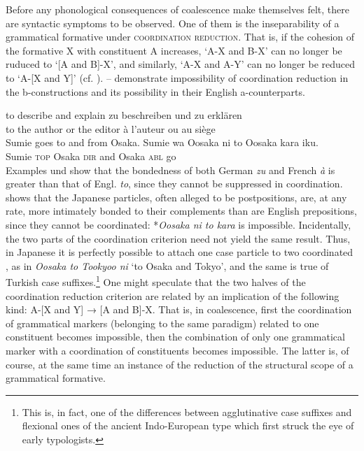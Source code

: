 Before any phonological consequences of coalescence make themselves felt, there are syntactic symptoms to be observed. One of them is the inseparability of a grammatical formative under \textsc{coordination reduction}. That is, if the cohesion of the formative X with constituent A increases, ‘A-X and B-X’ can no longer be ruduced to ‘[A and B]-X’, and similarly, ‘A-X and A-Y’ can no longer be reduced to ‘A-[X and Y]’ (cf. \citealt[198--201]{MallinsonEtAl1981}).  --  demonstrate impossibility of coordination reduction in the b-constructions and its possibility in their English a-counterparts.
 
\ea\label{ex:E105}
\langinfo{\LangGerm}{}{} 
 \ea to describe and explain 
 \ex zu beschreiben und zu erklären
\z
\z
\noindent \ea\label{ex:E106}
\langinfo{\LangFren}{}{} \\

\ea to the author or the editor
\ex à l'auteur ou au siège
\z
\z
\enlargethispage{2\baselineskip}
\noindent \ea\label{ex:E107}
\\
 \ea  Sumie goes to and from Osaka. 
\ex
\gll Sumie  wa  Oosaka  ni  to  Oosaka  kara  iku.\\
   Sumie  \textsc{top}  Osaka  \textsc{dir}  and  Osaka  \textsc{abl}  go\\
\z
\z
\noindent \label{page161}Examples  und  show that the bondedness of both German \textit{zu} and French \textit{à} is greater than that of Engl. \textit{to}, since they cannot be suppressed in coordination.  shows that the Japanese particles, often alleged to be postpositions, are, at any rate, more intimately bonded to their complements than are English prepositions, since they cannot be coordinated: *\textit{Oosaka ni to kara} is impossible. Incidentally, the two parts of the coordination criterion need not yield the same result. Thus, in Japanese it is perfectly possible to attach one case particle to two coordinated \nps, as in \textit{Oosaka to Tookyoo ni} ‘to Osaka and Tokyo’, and the same is true of Turkish case suffixes.\footnote{This is, in fact, one of the differences between agglutinative case suffixes and flexional ones of the ancient Indo-European type which first struck the eye of early typologists.} One might speculate that the two halves of the coordination reduction criterion are related by an implication of the following kind: A-[X and Y] → [A and B]-X. That is, in coalescence, first the coordination of grammatical markers (belonging to the same paradigm) related to one constituent becomes impossible, then the combination of only one grammatical marker with a coordination of constituents becomes impossible. The latter is, of course, at the same time an instance of the reduction of the structural scope of a grammatical formative.\label{page161b}

